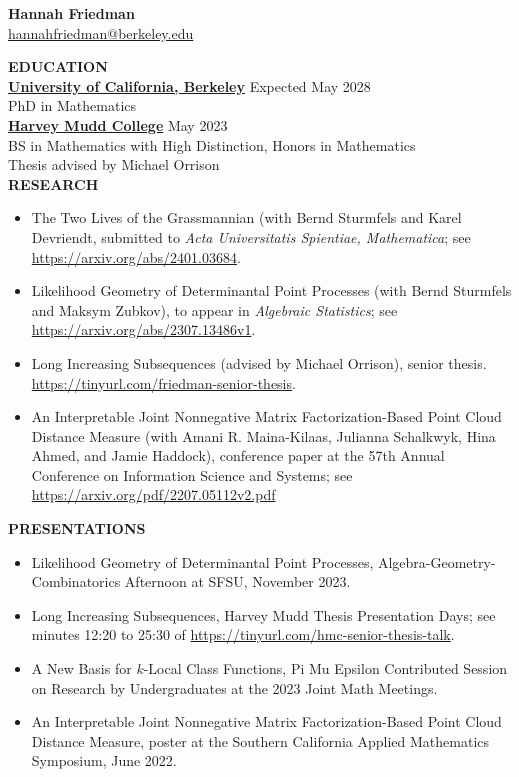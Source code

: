 \documentclass[11pt]{article}
\newcommand{\hdr}[1]{\textcolor{blue(ryb)}{\textbf{#1}}}
\begin{document}
\begin{center}
\hdr{\Large{Hannah Friedman}}\\
\url{hannahfriedman@berkeley.edu}\\
\end{center}
\medskip
\raggedright
\hdr{EDUCATION}\\
\textbf{\underline{University of California, Berkeley}} \hfill Expected May 2028\\
PhD in Mathematics\\
\textbf{\underline{Harvey Mudd College}} \hfill May 2023\\
BS in Mathematics with High Distinction, Honors in Mathematics\\
Thesis advised by Michael Orrison\\
\medskip
\hdr{RESEARCH}\\
\begin{itemize}
\item The Two Lives of the Grassmannian (with Bernd Sturmfels and Karel Devriendt, submitted to \textit{Acta Universitatis Spientiae, Mathematica}; see  \url{https://arxiv.org/abs/2401.03684}.
\item Likelihood Geometry of Determinantal Point Processes (with Bernd Sturmfels and Maksym Zubkov), to appear in \emph{Algebraic Statistics}; see  \url{https://arxiv.org/abs/2307.13486v1}.
\item Long Increasing Subsequences (advised by Michael Orrison), senior thesis.  \url{https://tinyurl.com/friedman-senior-thesis}.
\item An Interpretable Joint Nonnegative Matrix Factorization-Based Point Cloud Distance Measure (with Amani R. Maina-Kilaas, Julianna Schalkwyk, Hina Ahmed, and Jamie Haddock), conference paper at the 57th Annual Conference on Information Science and Systems; see \url{https://arxiv.org/pdf/2207.05112v2.pdf}
\end{itemize}
\hdr{PRESENTATIONS}\\
\begin{itemize}
\item Likelihood Geometry of Determinantal Point Processes, Algebra-Geometry-Combinatorics Afternoon at SFSU, November 2023.
\item Long Increasing Subsequences, Harvey Mudd Thesis Presentation Days; see minutes 12:20 to 25:30 of \url{https://tinyurl.com/hmc-senior-thesis-talk}.
\item A New Basis for $k$-Local Class Functions, Pi Mu Epsilon Contributed Session on Research by Undergraduates at the 2023 Joint Math Meetings.
\item An Interpretable Joint Nonnegative Matrix Factorization-Based Point Cloud Distance Measure, poster at the Southern California Applied Mathematics Symposium, June 2022.
\end{itemize}
\end{document}
